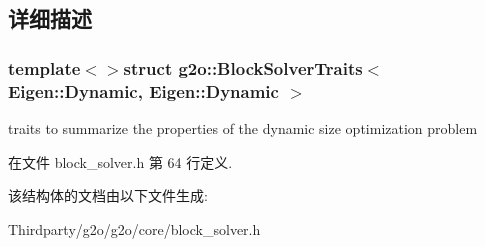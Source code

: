 \subsection{详细描述}
\subsubsection*{template$<$$>$struct g2o\-::\-Block\-Solver\-Traits$<$ Eigen\-::\-Dynamic, Eigen\-::\-Dynamic $>$}

traits to summarize the properties of the dynamic size optimization problem 

在文件 block\-\_\-solver.\-h 第 64 行定义.



该结构体的文档由以下文件生成\-:\begin{DoxyCompactItemize}
\item 
Thirdparty/g2o/g2o/core/block\-\_\-solver.\-h\end{DoxyCompactItemize}
